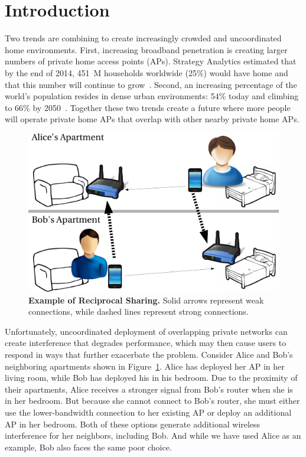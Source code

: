 \section{Introduction}
\label{sec-introduction}

Two trends are combining to create increasingly crowded and uncoordinated
home \wifi{} environments. First, increasing broadband penetration is
creating larger numbers of private home access points (APs). Strategy
Analytics estimated that by the end of 2014, 451~M households worldwide
(25\%) would have home \wifi{} and that this number will continue to
grow~\cite{wifi-survey}. Second, an increasing percentage of the world's
population resides in dense urban environments: 54\% today and climbing to
66\% by 2050~\cite{urbanization-survey}. Together these two trends create a
future where more people will operate private home APs that overlap with
other nearby private home APs.

\begin{figure}[t]
  \includegraphics[width=\columnwidth]{./figures/motivation.pdf}
  \caption{\textbf{Example of Reciprocal \wifi{} Sharing.} Solid arrows
  represent weak connections, while dashed lines represent strong
  connections.}
  \label{fig:motivation}
\end{figure}

Unfortunately, uncoordinated deployment of overlapping private networks can
create interference that degrades performance, which may then cause users to
respond in ways that further exacerbate the problem. Consider Alice and Bob's
neighboring apartments shown in Figure~\ref{fig:motivation}. Alice has
deployed her AP in her living room, while Bob has deployed his in his
bedroom. Due to the proximity of their apartments, Alice receives a stronger
signal from Bob's router when she is in her bedroom. But because she cannot
connect to Bob's router, she must either use the lower-bandwidth connection
to her existing AP or deploy an additional AP in her bedroom. Both of these
options generate additional wireless interference for her neighbors,
including Bob. And while we have used Alice as an example, Bob also faces the
same poor choice.

